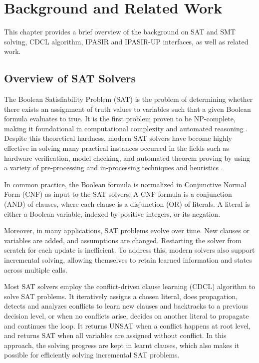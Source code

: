 \chapter{Background and Related Work}

This chapter provides a brief overview of the background on SAT and SMT solving, CDCL algorithm, IPASIR and IPASIR-UP interfaces, as well as related work.

\section{Overview of SAT Solvers}

The Boolean Satisfiability Problem (SAT) is the problem of determining whether there exists an assignment of truth values to variables such that a given Boolean formula evaluates to true. It is the first problem proven to be NP-complete, making it foundational in computational complexity and automated reasoning \cite{10.1145/800157.805047}\cite{Lev73}. Despite this theoretical hardness, modern SAT solvers have become highly effective in solving many practical instances occurred in the fields such as hardware verification, model checking, and automated theorem proving by using a variety of pre-processing and in-processing techniques and heuristics \cite{MINGTE1990289}\cite{267789}.

In common practice, the Boolean formula is normalized in Conjunctive Normal Form (CNF) as input to the SAT solvers. A CNF formula is a conjunction (AND) of clauses, where each clause is a disjunction (OR) of literals. A literal is either a Boolean variable, indexed by positive integers, or its negation.

Moreover, in many applications, SAT problems evolve over time. New clauses or variables are added, and assumptions are changed. Restarting the solver from scratch for each update is inefficient. To address this, modern solvers also support incremental solving, allowing themselves to retain learned information and states across multiple calls.

Most SAT solvers employ the conflict-driven clause learning (CDCL) algorithm to solve SAT problems. It iteratively assigns a chosen literal, does propagation, detects and analyzes conflicts to learn new clauses and backtracks to a previous decision level, or when no conflicts arise, decides on another literal to propagate and continues the loop. It returns UNSAT when a conflict happens at root level, and returns SAT when all variables are assigned without conflict. In this approach, the solving progress are kept in learnt clauses, which also makes it possible for efficiently solving incremental SAT problems.

